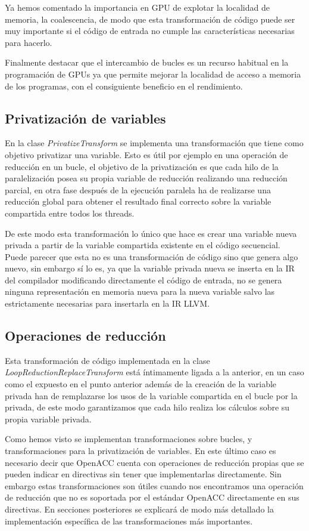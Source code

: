 Ya hemos comentado la importancia en GPU de explotar la localidad de memoria, la coalescencia, de modo que esta transformación de código puede ser muy importante si el código de entrada no cumple las características necesarias para hacerlo.

Finalmente destacar que el intercambio de bucles es un recurso habitual en la programación de GPUs ya que permite mejorar la localidad de acceso a memoria de los programas, con el consiguiente beneficio en el rendimiento.

\subsection{Privatización de variables}

En la clase \textit{PrivatizeTransform} se implementa una transformación que tiene como objetivo privatizar una variable. Esto es útil por ejemplo en una operación de reducción en un bucle, el objetivo de la privatización es que cada hilo de la paralelización posea su propia variable de reducción realizando una reducción parcial, en otra fase después de la ejecución paralela ha de realizarse una reducción global para obtener el resultado final correcto sobre la variable compartida entre todos los threads.

De este modo esta transformación lo único que hace es crear una variable nueva privada a partir de la variable compartida existente en el código secuencial. Puede parecer que esta no es una transformación de código sino que genera algo nuevo, sin embargo sí lo es, ya que la variable privada nueva se inserta en la IR del compilador modificando directamente el código de entrada, no se genera ninguna representación en memoria nueva para la nueva variable salvo las estrictamente necesarias para insertarla en la IR LLVM.

\subsection{Operaciones de reducción}

Esta transformación de código implementada en la clase \textit{LoopReductionReplaceTransform} está íntimamente ligada a la anterior, en un caso como el expuesto en el punto anterior además de la creación de la variable privada han de remplazarse los usos de la variable compartida en el bucle por la privada, de este modo garantizamos que cada hilo realiza los cálculos sobre su propia variable privada. 


Como hemos visto se implementan transformaciones sobre bucles, y transformaciones para la privatización de variables. En este último caso es necesario decir que OpenACC cuenta con operaciones de reducción propias que se pueden indicar en directivas sin tener que implementarlas directamente. Sin embargo estas transformaciones son útiles cuando nos encontramos una operación de reducción que no es soportada por el estándar OpenACC directamente en sus directivas. En secciones posteriores se explicará de modo más detallado la implementación específica de las transformaciones más importantes.

